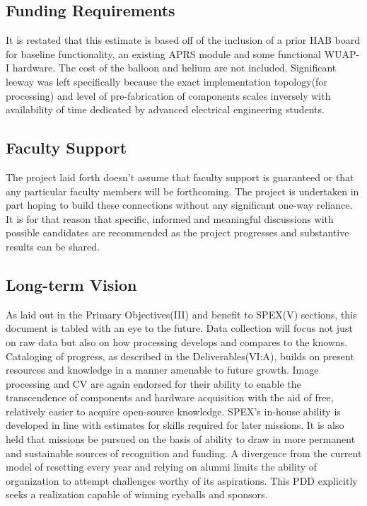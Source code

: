 \documentclass[conference]{IEEEtran} %
\begin{document}
\subsection{Funding Requirements}


It is restated that this estimate is based off of the inclusion of a prior HAB board for baseline functionality, an existing APRS module and some functional WUAP-I hardware. The cost of the balloon and helium are not included. Significant leeway was left specifically because the exact implementation topology(for processing) and level of pre-fabrication of components scales inversely with availability of time dedicated by advanced electrical engineering students.

\subsection{Faculty Support}
The project laid forth doesn't assume that faculty support is guaranteed or that any particular faculty members will be forthcoming. The project is undertaken in part hoping to build these connections without any significant one-way reliance. It is for that reason that specific, informed and meaningful discussions with possible candidates are recommended as the project progresses and substantive results can be shared.

\subsection{Long-term Vision}
As laid out in the Primary Objectives(III) and benefit to SPEX(V) sections, this document is tabled with an eye to the future. Data collection will focus not just on raw data but also on how processing develops and compares to the knowns. Cataloging of progress, as described in the Deliverables(VI:A), builds on present resources and knowledge in a manner amenable to future growth. Image processing and CV are again endorsed for their ability to enable the transcendence of components and hardware acquisition with the aid of free, relatively easier to acquire open-source knowledge. SPEX's in-house ability is developed in line with estimates for skills required for later missions. It is also held that missions be pursued on the basis of ability to draw in more permanent and sustainable sources of recognition and funding. A divergence from the current model of resetting every year and relying on alumni limits the ability of organization to attempt challenges worthy of its aspirations. This PDD explicitly seeks a realization capable of winning eyeballs and sponsors.
\end{document}
